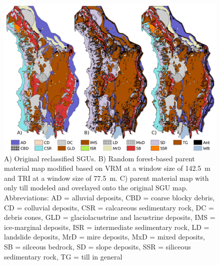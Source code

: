 \documentclass[preprint,12pt,authoryear]{elsarticle}
\begin{document}
 \begin{figure}[ht!]
\includegraphics[width=\textwidth]{SGUandmodel_100pi.pdf}
\caption{ A) Original reclassified SGUs. B) Random forest-based parent material map modified based on VRM at a window size of 142.5~m and TRI at a window size of 77.5~m. C) parent material map with only till modeled and overlayed onto the original SGU map. Abbreviations: AD = alluvial deposits, CBD = coarse blocky debris, CD = colluvial deposits, CSR = calcareous sedimentary rock, DC = debris cones, GLD = glaciolacustrine and lacustrine deposits, IMS = ice-marginal deposits, ISR = intermediate sedimentary rock, LD = landslide deposits, MrD = mire deposits, MxD = mixed deposits, SB = silceous bedrock, SD = slope deposits, SSR = siliceous sedimentary rock, TG = till in general  }
\label{fig:SGUandmodel}
\end{figure}
\end{document}
